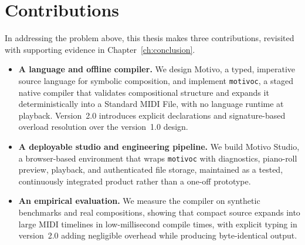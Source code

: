\section{Contributions}\label{sec:intro-contributions}

In addressing the problem above, this thesis makes three contributions, revisited with supporting evidence in
Chapter~\ref{ch:conclusion}.

\begin{itemize}
  \item \textbf{A language and offline compiler.}
    We design Motivo, a typed, imperative source language for symbolic composition, and implement \texttt{motivoc},
    a staged native compiler that validates compositional structure and expands it deterministically into a
    Standard MIDI File, with no language runtime at playback.
    Version~2.0 introduces explicit declarations and signature-based overload resolution over the version~1.0
    design.

  \item \textbf{A deployable studio and engineering pipeline.}
    We build Motivo Studio, a browser-based environment that wraps \texttt{motivoc} with diagnostics, piano-roll
    preview, playback, and authenticated file storage, maintained as a tested, continuously integrated product
    rather than a one-off prototype.

  \item \textbf{An empirical evaluation.}
    We measure the compiler on synthetic benchmarks and real compositions, showing that compact source expands into
    large MIDI timelines in low-millisecond compile times, with explicit typing in version~2.0 adding negligible
    overhead while producing byte-identical output.
\end{itemize}
